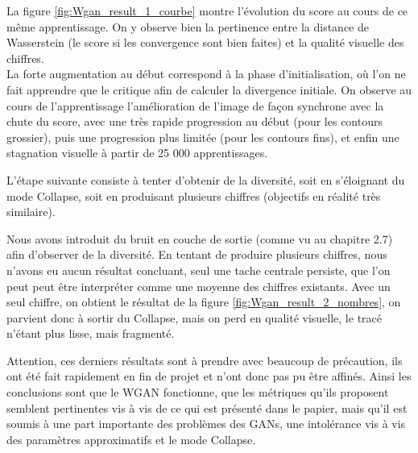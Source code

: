 	La figure \ref{fig:Wgan_result_1_courbe} montre l'évolution du score au cours de ce même apprentissage. On y observe bien la pertinence entre la distance de Wasserstein (le score si les convergence sont bien faites) et la qualité visuelle des chiffres. \\
	La forte augmentation au début correspond à la phase d'initialisation, où l'on ne fait apprendre que le critique afin de calculer la divergence initiale. On observe au cours de l'apprentissage l'amélioration de l'image de façon synchrone avec la chute du score, avec une très rapide progression au début (pour les contours grossier), puis une progression plus limitée (pour les contours fins), et enfin une stagnation visuelle à partir de 25 000 apprentissages.

	L'étape suivante consiste à tenter d'obtenir de la diversité, soit en s’éloignant du mode Collapse, soit en produisant plusieurs chiffres (objectifs en réalité très similaire). 

	Nous avons introduit du bruit en couche de sortie (comme vu au chapitre 2.7) afin d'observer de la diversité. En tentant de produire plusieurs chiffres, nous n'avons eu aucun résultat concluant, seul une tache centrale persiste, que l'on peut peut être interpréter comme une moyenne des chiffres existants. Avec un seul chiffre, on obtient le résultat de la figure \ref{fig:Wgan_result_2_nombres}, on parvient donc à sortir du Collapse, mais on perd en qualité visuelle, le tracé n'étant plus lisse, mais fragmenté.

	Attention, ces derniers résultats sont à prendre avec beaucoup de précaution, ils ont été fait rapidement en fin de projet et n'ont donc pas pu être affinés. Ainsi les conclusions sont que le WGAN fonctionne, que les métriques qu'ils proposent semblent pertinentes vis à vis de ce qui est présenté dans le papier, mais qu'il est soumis à une part importante des problèmes des GANs, une intolérance vis à vis des paramètres approximatifs et le mode Collapse.

